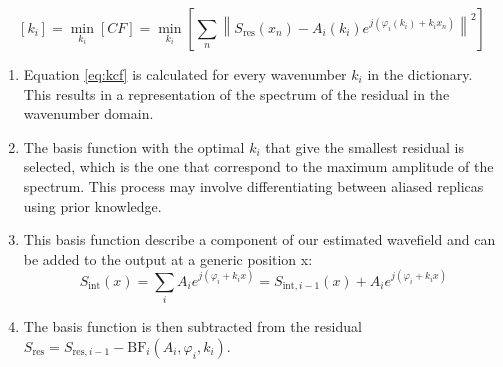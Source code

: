 \begin{equation}
	\left[k_i\right]=\min _{k_i}[C F]=\min _{k_i}\left[\sum_n\left\|S_{\text{res}}\left(x_n\right)-A_i\left(k_i\right) e^{j\left(\varphi_i\left(k_i\right)+k_i x_n\right)}\right\|^2\right]
	\label{eq:kcf}
\end{equation}
\begin{enumerate}
	\item Equation \ref{eq:kcf} is calculated for every wavenumber $k_i$ in the dictionary. This results in a representation of the spectrum of the residual in the wavenumber domain.
	\item The basis function with the optimal $k_i$ that give the smallest residual is selected, which is the one that correspond to the maximum amplitude of the spectrum. This process may involve differentiating between aliased replicas using prior knowledge.
	\item This basis function describe a component of our estimated wavefield and can be added to the output at a generic position x:
	\begin{equation}
		S_{\text{int}}(x)=\sum_{i} A_i e^{j\left(\varphi_i+k_i x\right)}=S_{\text{int},i-1}(x)+A_i e^{j\left(\varphi_i+k_i x\right)}
		\label{eq:s_int}
	\end{equation}
	\item The basis function is then subtracted from the residual $S_{\text{res}}= S_{\text{res},i-1}-\mathrm{BF}_i(A_i,\varphi_i,k_i)$.
	
	
\end{enumerate}
